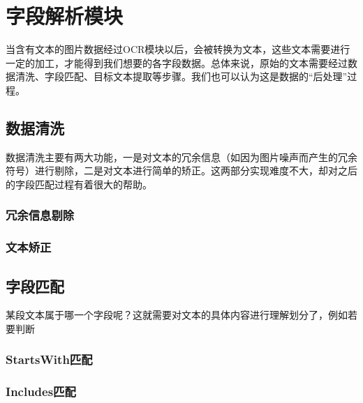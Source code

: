 \section{字段解析模块}  %
当含有文本的图片数据经过OCR模块以后，会被转换为文本，这些文本需要进行一定的加工，才能得到我们想要的各字段数据。总体来说，原始的文本需要经过数据清洗、字段匹配、目标文本提取等步骤。我们也可以认为这是数据的“后处理”过程。

\subsection{数据清洗}
数据清洗主要有两大功能，一是对文本的冗余信息（如因为图片噪声而产生的冗余符号）进行剔除，二是对文本进行简单的矫正。这两部分实现难度不大，却对之后的字段匹配过程有着很大的帮助。
\subsubsection{冗余信息剔除}
\subsubsection{文本矫正}

\subsection{字段匹配}
某段文本属于哪一个字段呢？这就需要对文本的具体内容进行理解划分了，例如若要判断
\subsubsection{StartsWith匹配}
\subsubsection{Includes匹配}


